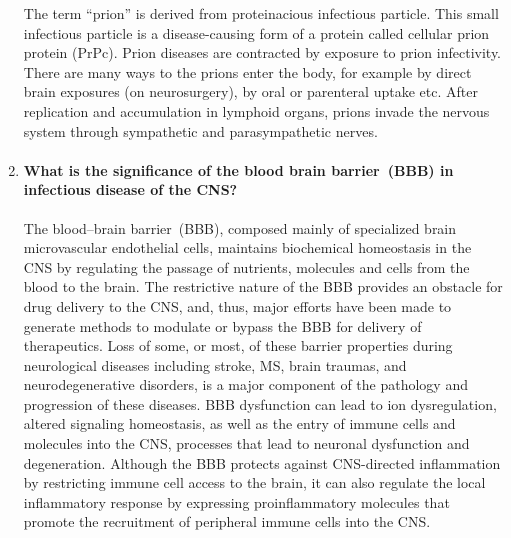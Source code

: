 \documentclass[12pt,article,oneside,a4paper]{memoir}
\begin{document}
\begin{enumerate}
The term ``prion'' is derived from proteinacious infectious particle. This
small infectious particle is a disease-causing form of a protein called
cellular prion protein (PrPc). Prion diseases are contracted by exposure to
prion infectivity. There are many ways to the prions enter the body, for
example by direct brain exposures (on neurosurgery), by oral or parenteral
uptake etc.
After replication and accumulation in lymphoid organs, prions invade the
nervous system through sympathetic and parasympathetic nerves.

\item \paragraph{What is the significance of the blood brain barrier~(BBB) in
infectious disease of the CNS?}
The blood–brain barrier~(BBB), composed mainly of specialized brain
microvascular endothelial cells, maintains biochemical homeostasis in the CNS
by regulating the passage of nutrients, molecules and cells from the blood to
the brain.
The restrictive nature of the BBB provides an obstacle for drug delivery to the
CNS, and, thus, major efforts have been made to generate methods to modulate or
bypass the BBB for delivery of therapeutics. Loss of some, or most, of these
barrier properties during neurological diseases including stroke, MS, brain
traumas, and neurodegenerative disorders, is a major component of the pathology
and progression of these diseases. BBB dysfunction can lead to ion
dysregulation, altered signaling homeostasis, as well as the entry of immune
cells and molecules into the CNS, processes that lead to neuronal dysfunction
and degeneration.
Although the BBB protects against CNS-directed inflammation by restricting
immune cell access to the brain, it can also regulate the local inflammatory
response by expressing proinflammatory molecules that promote the recruitment
of peripheral immune cells into the CNS.
\end{enumerate}

\end{document}

